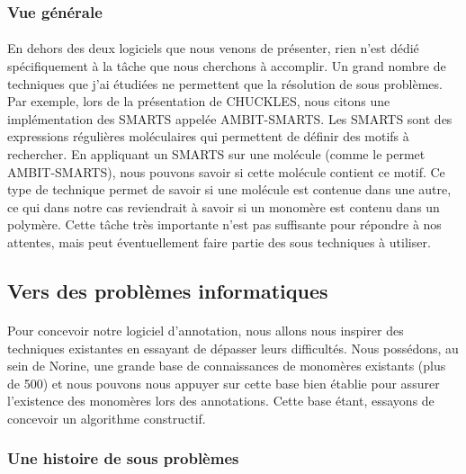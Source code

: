 \documentclass[12pt,french,twoside]{report}
\begin{document}
\subsubsection{Vue générale}

\paragraph{}En dehors des deux logiciels que nous venons de présenter, rien n'est dédié spécifiquement à la tâche que nous cherchons à accomplir.
Un grand nombre de techniques que j'ai étudiées ne permettent que la résolution de sous problèmes.
Par exemple, lors de la présentation de CHUCKLES, nous citons une implémentation des SMARTS appelée AMBIT-SMARTS.
Les SMARTS sont des expressions régulières moléculaires qui permettent de définir des motifs à rechercher.
En appliquant un SMARTS sur une molécule (comme le permet AMBIT-SMARTS), nous pouvons savoir si cette molécule contient ce motif.
Ce type de technique permet de savoir si une molécule est contenue dans une autre, ce qui dans notre cas reviendrait à savoir si un monomère est contenu dans un polymère.
Cette tâche très importante n'est pas suffisante pour répondre à nos attentes, mais peut éventuellement faire partie des sous techniques à utiliser.




\subsection{Vers des problèmes informatiques}

\paragraph{}Pour concevoir notre logiciel d'annotation, nous allons nous inspirer des techniques existantes en essayant de dépasser leurs difficultés.
Nous possédons, au sein de Norine, une grande base de connaissances de monomères existants (plus de 500) et nous pouvons nous appuyer sur cette base bien établie pour assurer l'existence des monomères lors des annotations.
Cette base étant, essayons de concevoir un algorithme constructif.


\subsubsection{Une histoire de sous problèmes}
\end{document}
